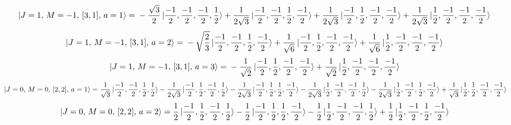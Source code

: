 \documentclass{article}
\begin{document}
\begin{equation*}
\begin{aligned}
\ket{J=1,\,M=-1,\,[3,1],\,a=1} = \; &- \frac{\sqrt{3}}{2} \ket{\frac{-1}{2},\frac{-1}{2},\frac{-1}{2},\frac{1}{2}} + \frac{1}{2\sqrt{3}} \ket{\frac{-1}{2},\frac{-1}{2},\frac{1}{2},\frac{-1}{2}} + \frac{1}{2\sqrt{3}} \ket{\frac{-1}{2},\frac{1}{2},\frac{-1}{2},\frac{-1}{2}} + \frac{1}{2\sqrt{3}} \ket{\frac{1}{2},\frac{-1}{2},\frac{-1}{2},\frac{-1}{2}}
\end{aligned}
\end{equation*}
\begin{equation*}
\begin{aligned}
\ket{J=1,\,M=-1,\,[3,1],\,a=2} = \; &- \sqrt{\frac{2}{3}} \ket{\frac{-1}{2},\frac{-1}{2},\frac{1}{2},\frac{-1}{2}} + \frac{1}{\sqrt{6}} \ket{\frac{-1}{2},\frac{1}{2},\frac{-1}{2},\frac{-1}{2}} + \frac{1}{\sqrt{6}} \ket{\frac{1}{2},\frac{-1}{2},\frac{-1}{2},\frac{-1}{2}}
\end{aligned}
\end{equation*}
\begin{equation*}
\begin{aligned}
\ket{J=1,\,M=-1,\,[3,1],\,a=3} = \; &- \frac{1}{\sqrt{2}} \ket{\frac{-1}{2},\frac{1}{2},\frac{-1}{2},\frac{-1}{2}} + \frac{1}{\sqrt{2}} \ket{\frac{1}{2},\frac{-1}{2},\frac{-1}{2},\frac{-1}{2}}
\end{aligned}
\end{equation*}
\begin{equation*}
\begin{aligned}
\ket{J=0,\,M=0,\,[2,2],\,a=1} = \; &\frac{1}{\sqrt{3}} \ket{\frac{-1}{2},\frac{-1}{2},\frac{1}{2},\frac{1}{2}} - \frac{1}{2\sqrt{3}} \ket{\frac{-1}{2},\frac{1}{2},\frac{-1}{2},\frac{1}{2}} - \frac{1}{2\sqrt{3}} \ket{\frac{-1}{2},\frac{1}{2},\frac{1}{2},\frac{-1}{2}} - \frac{1}{2\sqrt{3}} \ket{\frac{1}{2},\frac{-1}{2},\frac{-1}{2},\frac{1}{2}} - \frac{1}{2\sqrt{3}} \ket{\frac{1}{2},\frac{-1}{2},\frac{1}{2},\frac{-1}{2}} + \frac{1}{\sqrt{3}} \ket{\frac{1}{2},\frac{1}{2},\frac{-1}{2},\frac{-1}{2}}
\end{aligned}
\end{equation*}
\begin{equation*}
\begin{aligned}
\ket{J=0,\,M=0,\,[2,2],\,a=2} = \; &\frac{1}{2} \ket{\frac{-1}{2},\frac{1}{2},\frac{-1}{2},\frac{1}{2}} - \frac{1}{2} \ket{\frac{-1}{2},\frac{1}{2},\frac{1}{2},\frac{-1}{2}} - \frac{1}{2} \ket{\frac{1}{2},\frac{-1}{2},\frac{-1}{2},\frac{1}{2}} + \frac{1}{2} \ket{\frac{1}{2},\frac{-1}{2},\frac{1}{2},\frac{-1}{2}}
\end{aligned}
\end{equation*}
\end{document}
